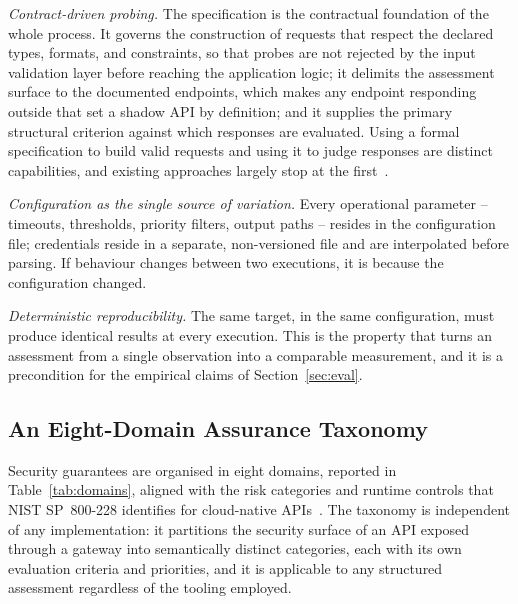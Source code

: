 \documentclass[
]{ceurart}
\begin{document}
\emph{Contract-driven probing.} The specification is the contractual foundation of the whole process.
It governs the construction of requests that respect the declared types, formats, and constraints, so that probes are not rejected by the input validation layer before reaching the application logic; it delimits the assessment surface to the documented endpoints, which makes any endpoint responding outside that set a shadow API by definition; and it supplies the primary structural criterion against which responses are evaluated.
Using a formal specification to build valid requests and using it to judge responses are distinct capabilities, and existing approaches largely stop at the first~\cite{atlidakisRESTlerStatefulREST2019a}.

\emph{Configuration as the single source of variation.} Every operational parameter -- timeouts, thresholds, priority filters, output paths -- resides in the configuration file; credentials reside in a separate, non-versioned file and are interpolated before parsing.
If behaviour changes between two executions, it is because the configuration changed.

\emph{Deterministic reproducibility.} The same target, in the same configuration, must produce identical results at every execution.
This is the property that turns an assessment from a single observation into a comparable measurement, and it is a precondition for the empirical claims of Section~\ref{sec:eval}.

\subsection{An Eight-Domain Assurance Taxonomy}

Security guarantees are organised in eight domains, reported in Table~\ref{tab:domains}, aligned with the risk categories and runtime controls that NIST SP~800-228 identifies for cloud-native APIs~\cite{chandramouliGuidelinesAPIProtection2026}.
The taxonomy is independent of any implementation: it partitions the security surface of an API exposed through a gateway into semantically distinct categories, each with its own evaluation criteria and priorities, and it is applicable to any structured assessment regardless of the tooling employed.
\end{document}
